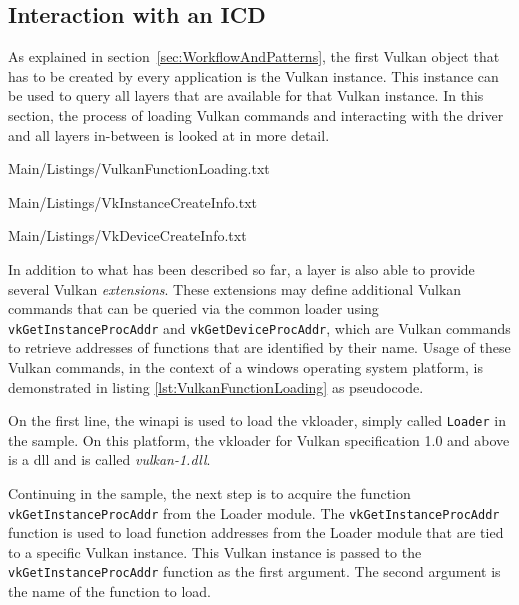     \subsection{Interaction with an ICD}

    As explained in section~\ref{sec:WorkflowAndPatterns}, the first Vulkan object that has to be created by every application is the Vulkan instance.
    This instance can be used to query all layers that are available for that Vulkan instance.
    In this section, the process of loading Vulkan commands and interacting with the \gls{driver} and all layers in-between is looked at in more detail.

    
    {Main/Listings/VulkanFunctionLoading.txt}

    
    {Main/Listings/VkInstanceCreateInfo.txt}

    
    {Main/Listings/VkDeviceCreateInfo.txt}

    In addition to what has been described so far, a layer is also able to provide several Vulkan \textit{extensions}.
    These extensions may define additional Vulkan commands that can be queried via the common loader using \lstinline{vkGetInstanceProcAddr} and \lstinline{vkGetDeviceProcAddr}, which are Vulkan commands to retrieve addresses of functions that are identified by their name.
    Usage of these Vulkan commands, in the context of a \gls{windows} operating system platform, is demonstrated in listing \ref{lst:VulkanFunctionLoading} as pseudocode.

    On the first line, the \gls{winapi} is used to load the \gls{vkloader}, simply called \lstinline{Loader} in the sample.
    On this platform, the \gls{vkloader} for Vulkan specification 1.0 and above is a \gls{dll} and is called \textit{vulkan-1.dll}.

    Continuing in the sample, the next step is to acquire the function \lstinline{vkGetInstanceProcAddr} from the Loader module.
    The \lstinline{vkGetInstanceProcAddr} function is used to load function addresses from the Loader module that are tied to a specific Vulkan instance.
    This Vulkan instance is passed to the \lstinline{vkGetInstanceProcAddr} function as the first argument.
    The second argument is the name of the function to load.

